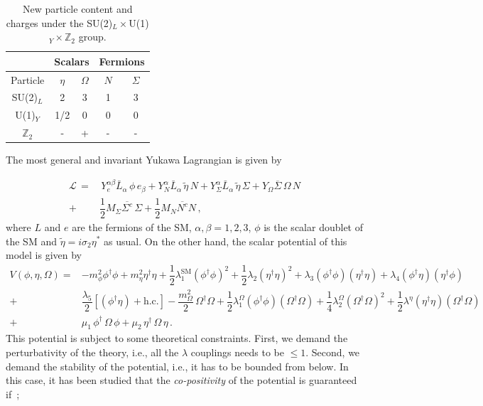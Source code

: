 \documentclass[12pt,letterpaper]{article}
\begin{document}
\begin{table}
\centering
\begin{tabular}{|c|c|c|c|c|}
\hline
 \multicolumn{1}{|c}{   }  &
 \multicolumn{2}{|c}{ Scalars  } &
  \multicolumn{2}{|c|}{ Fermions  }  \\
 \hline 
Particle & $\eta$ & $\Omega$ & $N$ & $\Sigma$\\
\hline
SU(2)$_L$ &2 &3 &1 &3\\
U(1)$_Y$ &1/2 &0 &0 &0\\
$\mathbb{Z}_2$ & - &+ &- &-\\
\hline
\end{tabular}
\caption{New particle content and charges under the SU(2)$_L\times
$U(1)$_Y\times\mathbb{Z}_2$ group.}
\label{tab:new-particle-content}
\end{table}

The most general and invariant Yukawa Lagrangian is given by

\begin{align}
\label{eq:full-lagrangian}
\mathcal{L}\, = &\, Y_e^{\alpha\beta}\bar{L}_{\alpha}\,\phi\, e_{\beta}
+  Y_N^{\alpha}\bar{L}_{\alpha}\,\tilde{\eta}\, N 
+  Y_{\Sigma}^{\alpha}\bar{L}_{\alpha}\,\tilde{\eta}\, \Sigma 
+  Y_{\Omega}\overline{\Sigma}\,\Omega\, N\nonumber \\
+& \dfrac{1}{2}M_{\Sigma}\overline{\Sigma^c}\,\Sigma
+ \dfrac{1}{2}M_{N}\overline{N^c}N \,,
\end{align}
where $L$ and $e$ are the fermions of the SM, $\alpha,\beta=1,2,3$, $\phi$ is the scalar doublet of the SM and $\tilde{\eta}=i\sigma_2\eta^*$ as usual. On the other hand, the scalar potential of this model is given by
\begin{align}
\label{eq:scalar-potential}
V(\phi,\eta, \Omega) = &
-m_{\phi}^2 \phi^{\dagger}\phi + m_{\eta}^2 \eta^{\dagger}\eta
+\dfrac{1}{2}\lambda_1^{\text{SM}} (\phi^{\dagger}\phi)^2
+\dfrac{1}{2}\lambda_2 (\eta^{\dagger}\eta)^2
+\lambda_3 (\phi^{\dagger}\phi)(\eta^{\dagger}\eta)
+\lambda_4 (\phi^{\dagger}\eta)(\eta^{\dagger}\phi) \nonumber \\
+& \dfrac{\lambda_5}{2}\left[(\phi^{\dagger}\eta) + \text{h.c.}\right]
-\dfrac{m_{\Omega}^2}{2}\,\Omega^{\dagger}\Omega
+\dfrac{1}{2}\lambda_1^{\Omega} (\phi^{\dagger}\phi)(\Omega^{\dagger}\Omega)
+\dfrac{1}{4}\lambda_2^{\Omega} (\Omega^{\dagger}\Omega)^2
+\dfrac{1}{2}\lambda^{\eta} (\eta^{\dagger}\eta)(\Omega^{\dagger}\Omega)\nonumber \\
+& \mu_1\,\phi^{\dagger}\,\Omega\,\phi + \mu_2\,\eta^{\dagger}\,\Omega\,\eta\,.
\end{align}
This potential is subject to some theoretical constraints. First, we demand the perturbativity of the theory, i.e., all the $\lambda$ couplings needs to be $\leq 1$. Second, we demand the stability of the potential, i.e., it has to be bounded from below. In this case, it has been studied that the \textit{co-positivity} of the potential is guaranteed if~\cite{Merle:2016scw};
\end{document}
